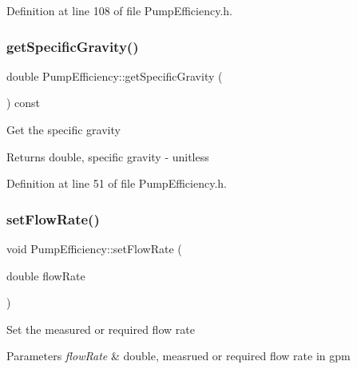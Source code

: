 Definition at line 108 of file Pump\+Efficiency.\+h.

\mbox{\label{class_pump_efficiency_a6eeeabb70d99a79a636f35ca74d8ec05}} 
\subsubsection{\texorpdfstring{get\+Specific\+Gravity()}{getSpecificGravity()}}
{\footnotesize\ttfamily double Pump\+Efficiency\+::get\+Specific\+Gravity (\begin{DoxyParamCaption}{ }\end{DoxyParamCaption}) const\hspace{0.3cm}{\ttfamily [inline]}}

Get the specific gravity

\begin{DoxyReturn}{Returns}
double, specific gravity -\/ unitless 
\end{DoxyReturn}


Definition at line 51 of file Pump\+Efficiency.\+h.

\mbox{\label{class_pump_efficiency_aad051c44f6bdbc6108f2c40450c9d510}} 
\subsubsection{\texorpdfstring{set\+Flow\+Rate()}{setFlowRate()}}
{\footnotesize\ttfamily void Pump\+Efficiency\+::set\+Flow\+Rate (\begin{DoxyParamCaption}\item[{double}]{flow\+Rate }\end{DoxyParamCaption})\hspace{0.3cm}{\ttfamily [inline]}}

Set the measured or required flow rate


\begin{DoxyParams}{Parameters}
{\em flow\+Rate} & double, measrued or required flow rate in gpm \\
\hline
\end{DoxyParams}


